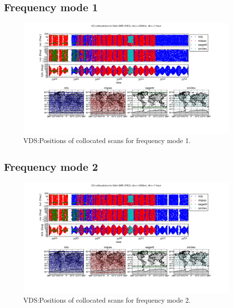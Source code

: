 \clearpage
\newpage

\subsection{Frequency mode 1}

\begin{figure}[t]
\centering
\includegraphics[width=17cm]{test_collocation_fm1.png}
\caption{VDS:Positions of collocated scans for frequency mode 1.}
\label{fig:vdsfm1}
\end{figure}


\clearpage
\newpage

\subsection{Frequency mode 2}

\begin{figure}[t]
\centering
\includegraphics[width=17cm]{test_collocation_fm2.png}
\caption{VDS:Positions of collocated scans for frequency mode 2.}
\label{fig:vdsfm1}
\end{figure}

\clearpage
\newpage

